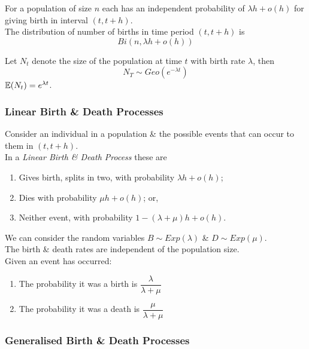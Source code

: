 \documentclass[11pt,a4paper]{article}
\begin{document}
For a population of size $n$ each has an independent probability of $\lambda h+o(h)$ for giving birth in interval $(t,t+h)$.\\
The distribution of number of births in time period $(t,t+h)$ is
$$Bi(n,\lambda h+o(h))$$

Let $N_t$ denote the size of the population at time $t$ with birth rate $\lambda$, then
$$N_T\sim Geo(e^{-\lambda t})$$
\nb $\mathbb{E}(N_t)=e^{\lambda t}$.

\subsubsection{Linear Birth \& Death Processes}

Consider an individual in a population \& the possible events that can occur to them in $(t,t+h)$.\\
In a \textit{Linear Birth \& Death Process} these are
\begin{enumerate}[label=\roman*)]
	\item Gives birth, splits in two, with probability $\lambda h+o(h)$;
	\item Dies with probability $\mu h+o(h)$; or,
	\item Neither event, with probability $1-(\lambda+\mu)h+o(h)$.
\end{enumerate}
\nb We can consider the random variables $B\sim Exp(\lambda)$ \& $D\sim Exp(\mu)$.\\
\nb The birth \& death rates are independent of the population size.\\

Given an event has occurred:
\begin{enumerate}[label=\roman*)]
	\item The probability it was a birth is $\dfrac{\lambda}{\lambda+\mu}$
	\item The probability it was a death is $\dfrac{\mu}{\lambda+\mu}$
\end{enumerate}

\subsubsection{Generalised Birth \& Death Processes}
\end{document}
